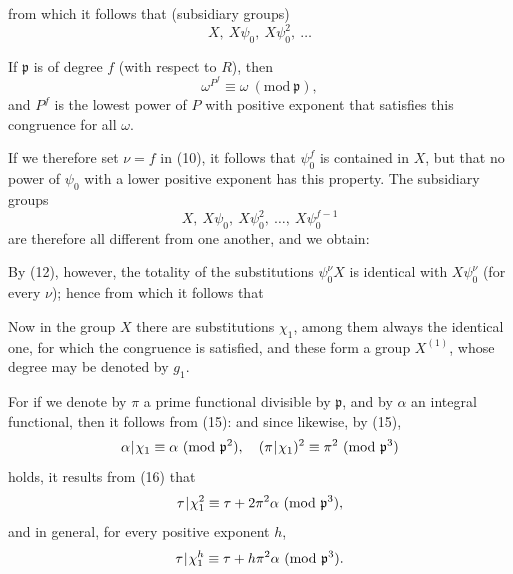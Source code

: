 from which it follows that  (subsidiary groups)
\[ X,\ X\psi_0,\ X\psi_0^2,\ \ldots \]

If $\mathfrak{p}$ is of degree $f$ (with respect to $R$), then
\[ \omega^{P^f} \equiv \omega\ (\mathrm{mod}\ \mathfrak{p}), \]
and $P^f$ is the lowest power of $P$ with positive exponent that satisfies this congruence for all $\omega$.

If we therefore set $\nu = f$ in (10), it follows that $\psi_0^f$ is contained in $X$, but that no power of $\psi_0$ with a lower positive exponent has this property. The subsidiary groups
\[ X,\ X\psi_0,\ X\psi_0^2,\ \ldots,\ X\psi_0^{f-1} \]
are therefore all different from one another, and we obtain:

By (12), however, the totality of the substitutions $\psi_0^\nu X$ is identical with $X\psi_0^\nu$ (for every $\nu$); hence
from which it follows that 


Now in the group $X$ there are substitutions $\chi_1$, among them always the identical one, for which the congruence
is satisfied, and these form a group $X^{(1)}$, whose degree may be denoted by $g_1$.

 For if we denote by $\pi$ a prime functional divisible by $\mathfrak{p}$, and by $\alpha$ an integral functional, then it follows from (15):
and since likewise, by (15),
\[ \alpha\mkern1mu|\mkern1mu\chi_1 \equiv \alpha\ (\mathrm{mod}\ \mathfrak{p}^2),\quad (\pi\mkern1mu|\mkern1mu\chi_1)^2 \equiv \pi^2\ (\mathrm{mod}\ \mathfrak{p}^3) \]
holds, it results from (16) that
\[ \tau\mkern1mu|\mkern1mu\chi_1^2 \equiv \tau + 2\pi^2\alpha\ (\mathrm{mod}\ \mathfrak{p}^3), \]
and in general, for every positive exponent $h$,
\[ \tau\mkern1mu|\mkern1mu\chi_1^h \equiv \tau + h\pi^2\alpha\ (\mathrm{mod}\ \mathfrak{p}^3). \]
